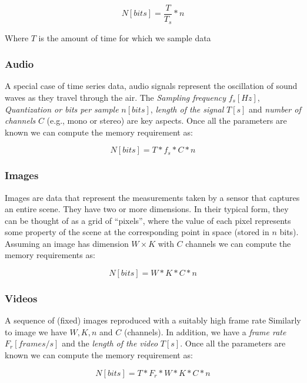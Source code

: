 \documentclass{article}
\begin{document}
        \begin{equation} 
          N [bits] = \frac{T}{T_s} *n
        \end{equation}

        Where $T$ is the amount of time for which we sample data
      \subsubsection{Audio}
        A special case of time series data, audio signals represent the oscillation of sound waves as they travel through the air. The \emph{Sampling frequency} $f_s [Hz]$, \emph{Quantization or bits per sample} $n [bits]$, \emph{length of the signal} $T [s]$ and \emph{number of channels} $C$ (e.g., mono or stereo) are key aspects.
        Once all the parameters are known we can compute the memory requirement as:
        
        \begin{equation} 
          N [bits] = T*f_s*C*n
        \end{equation}
      
      \subsubsection{Images}
        Images are data that represent the measurements taken by a sensor that captures an entire scene. They have two or more dimensions. In their typical form, they can be thought of as a
        grid of “pixels”, where the value of each pixel represents some property of the scene at the corresponding point in space (stored in $n$ bits). Assuming an image has dimension $W\times K$ with $C$ channels we can compute the memory requirements as:

        \begin{equation} 
          N [bits] = W*K*C*n
        \end{equation}

      \subsubsection{Videos}
        A sequence of (fixed) images reproduced with a suitably high frame rate
        Similarly to image we have $W, K, n$ and $C$ (channels). In addition, we have a \emph{frame rate} $F_r [frames/s]$ and the \emph{length of the video} $T [s]$.
        Once all the parameters are known we can compute the memory requirement as:

        \begin{equation} 
          N [bits] = T*F_r*W*K*C*n
        \end{equation}
\end{document}
